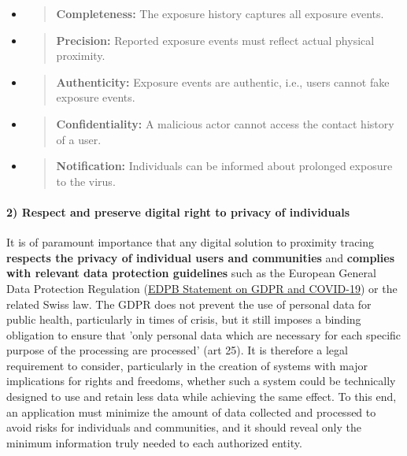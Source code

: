 \documentclass{article}
\begin{document}
\begin{itemize}
\item
  \begin{quote}
  \textbf{Completeness:} The exposure history captures all exposure
  events.
  \end{quote}
\item
  \begin{quote}
  \textbf{Precision:} Reported exposure events must reflect actual
  physical proximity.
  \end{quote}
\item
  \begin{quote}
  \textbf{Authenticity:} Exposure events are authentic, i.e., users
  cannot fake exposure events.
  \end{quote}
\item
  \begin{quote}
  \textbf{Confidentiality:} A malicious actor cannot access the contact
  history of a user.
  \end{quote}
\item
  \begin{quote}
  \textbf{Notification:} Individuals can be informed about prolonged
  exposure to the virus.
  \end{quote}
\end{itemize}

\paragraph{2) Respect and preserve digital right to privacy of
individuals}\label{respect-and-preserve-digital-right-to-privacy-of-individuals}

It is of paramount importance that any digital solution to proximity
tracing \hspace{0pt}\textbf{respects the privacy of individual users and
communities} \hspace{0pt}and \hspace{0pt}\textbf{complies with relevant
data protection guidelines} such as the European General Data Protection
Regulation
(\href{https://edpb.europa.eu/sites/edpb/files/files/file1/edpb_statement_2020_processingpersonaldataandcovid-19_en.pdf}{{EDPB
Statement on GDPR and COVID-19}}) or the related Swiss law\hspace{0pt}.
The GDPR does not prevent the use of personal data for public health,
particularly in times of crisis, but it still imposes a binding
obligation to ensure that 'only personal data which are necessary for
each specific purpose of the processing are processed' (art 25). It is
therefore a legal requirement to consider, particularly in the creation
of systems with major implications for rights and freedoms, whether such
a system could be technically designed to use and retain less data while
achieving the same effect. To this end, an application must minimize the
amount of data collected and processed to avoid risks for individuals
and communities, and it should reveal only the minimum information truly
needed to each authorized entity.
\end{document}
